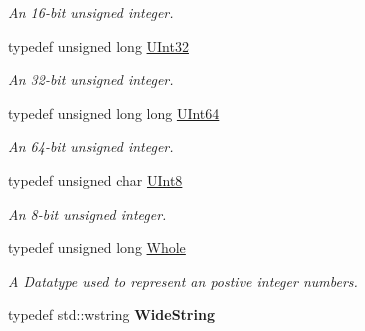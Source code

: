 \begin{DoxyCompactItemize}
\begin{DoxyCompactList}\small\item\em An 16-\/bit unsigned integer. \item\end{DoxyCompactList}\item 
\hypertarget{namespaceMezzanine_abea3b8e8e9b03d2547b2800284ba682d}{
typedef unsigned long \hyperlink{namespaceMezzanine_abea3b8e8e9b03d2547b2800284ba682d}{UInt32}}
\label{namespaceMezzanine_abea3b8e8e9b03d2547b2800284ba682d}

\begin{DoxyCompactList}\small\item\em An 32-\/bit unsigned integer. \item\end{DoxyCompactList}\item 
\hypertarget{namespaceMezzanine_ac690bcdbbe92a684875c5e8b16a33097}{
typedef unsigned long long \hyperlink{namespaceMezzanine_ac690bcdbbe92a684875c5e8b16a33097}{UInt64}}
\label{namespaceMezzanine_ac690bcdbbe92a684875c5e8b16a33097}

\begin{DoxyCompactList}\small\item\em An 64-\/bit unsigned integer. \item\end{DoxyCompactList}\item 
\hypertarget{namespaceMezzanine_aa5f38583d9025e05fa33d6e32e97b457}{
typedef unsigned char \hyperlink{namespaceMezzanine_aa5f38583d9025e05fa33d6e32e97b457}{UInt8}}
\label{namespaceMezzanine_aa5f38583d9025e05fa33d6e32e97b457}

\begin{DoxyCompactList}\small\item\em An 8-\/bit unsigned integer. \item\end{DoxyCompactList}\item 
typedef unsigned long \hyperlink{namespaceMezzanine_adcbb6ce6d1eb4379d109e51171e2e493}{Whole}
\begin{DoxyCompactList}\small\item\em A Datatype used to represent an postive integer numbers. \item\end{DoxyCompactList}\item 
\hypertarget{namespaceMezzanine_a9bd8d22fdfaf143314aa59a4374697e5}{
typedef std::wstring {\bfseries WideString}}
\label{namespaceMezzanine_a9bd8d22fdfaf143314aa59a4374697e5}

\end{DoxyCompactItemize}
